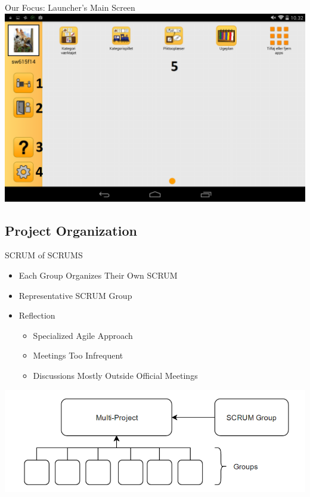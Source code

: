 \begin{frame}{Our Focus: Launcher's Main Screen}
\includegraphics[scale=0.28]{figures/MenuGuardian.png}
\end{frame}

\subsection{Project Organization}
\begin{frame}{SCRUM of SCRUMS}
\begin{itemize} 
	\item Each Group Organizes Their Own SCRUM
	\item Representative SCRUM Group
	\item Reflection
		\begin{itemize}
		    \item Specialized Agile Approach
		    \item Meetings Too Infrequent
		    \item Discussions Mostly Outside Official Meetings
		\end{itemize}
\end{itemize}
\includegraphics[scale=0.42]{figures/SoS.png} 
\end{frame}

